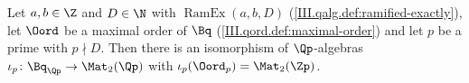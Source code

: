 Let $a,b\in\Z$ and $D\in\N$ with $\operatorname{RamEx}(a,b,D)$ (\cref{III.qalg.def:ramified-exactly}), let $\Oord$ be a maximal order of
$\Bq$ (\cref{III.qord.def:maximal-order}) and let $p$ be a prime with $p\nmid D$. Then there is an isomorphism of $\Qp$-algebras
$\iota_p\colon\Bq_{\Qp}\to\Mat_2(\Qp)$ with $\iota_p(\Oord_p)=\Mat_2(\Zp)$.

